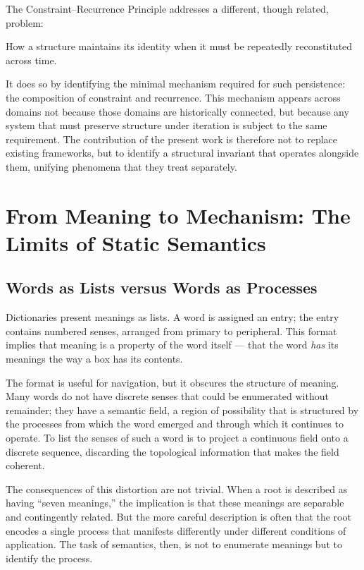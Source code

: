 \documentclass[12pt, oneside]{article}
\theoremstyle{definition}
\theoremstyle{remark}
\begin{document}
The Constraint--Recurrence Principle addresses a different, though related, problem:

\begin{quoting}
How a structure maintains its identity when it must be repeatedly reconstituted across time.
\end{quoting}

It does so by identifying the minimal mechanism required for such persistence: the composition of constraint and recurrence.
This mechanism appears across domains not because those domains are historically connected, but because any system that must preserve structure under iteration is subject to the same requirement.
The contribution of the present work is therefore not to replace existing frameworks, but to identify a structural invariant that operates alongside them, unifying phenomena that they treat separately.

\section{From Meaning to Mechanism: The Limits of Static Semantics}

\subsection{Words as Lists versus Words as Processes}

Dictionaries present meanings as lists.
A word is assigned an entry; the entry contains numbered senses, arranged from primary to peripheral.
This format implies that meaning is a property of the word itself --- that the word \emph{has} its meanings the way a box has its contents.

The format is useful for navigation, but it obscures the structure of meaning.
Many words do not have discrete senses that could be enumerated without remainder; they have a semantic field, a region of possibility that is structured by the processes from which the word emerged and through which it continues to operate.
To list the senses of such a word is to project a continuous field onto a discrete sequence, discarding the topological information that makes the field coherent.

The consequences of this distortion are not trivial.
When a root is described as having ``seven meanings,'' the implication is that these meanings are separable and contingently related.
But the more careful description is often that the root encodes a single process that manifests differently under different conditions of application.
The task of semantics, then, is not to enumerate meanings but to identify the process.
\end{document}
